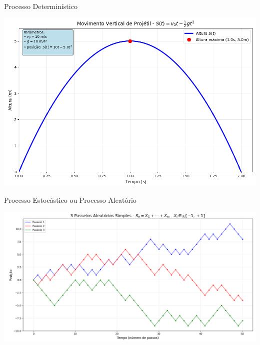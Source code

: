 \documentclass{beamer}
\begin{document}
\begin{frame}{Processo Determinístico}

\includegraphics[width=\textwidth]{projetil.png}

\end{frame}


\begin{frame}{Processo Estocástico ou Processo Aleatório}

\includegraphics[width=\textwidth]{srw1.png}

\end{frame}
\end{document}
